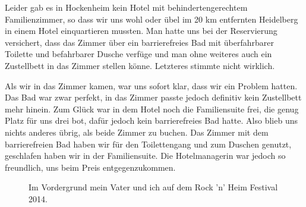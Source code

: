 \documentclass[fontsize=14pt,a4paper,headinclude,DIV=calc,automark]{scrbook}
\begin{document}
Leider gab es in Hockenheim kein Hotel mit behindertengerechtem Familienzimmer, so dass wir uns wohl oder übel im 20 km entfernten Heidelberg in einem Hotel einquartieren mussten. Man hatte uns bei der Reservierung versichert, dass das Zimmer über ein barrierefreies Bad mit überfahrbarer Toilette und befahrbarer Dusche verfüge und man ohne weiteres auch ein Zustellbett in das Zimmer stellen könne. Letzteres stimmte nicht wirklich.

Als wir in das Zimmer kamen, war uns sofort klar, dass wir ein Problem hatten. Das Bad war zwar perfekt, in das Zimmer passte jedoch definitiv kein Zustellbett mehr hinein. Zum Glück war in dem Hotel noch die Familiensuite frei, die genug Platz für uns drei bot, dafür jedoch kein barrierefreies Bad hatte. Also blieb uns nichts anderes übrig, als beide Zimmer zu buchen. Das Zimmer mit dem barrierefreien Bad haben wir für den Toilettengang und zum Duschen genutzt, geschlafen haben wir in der Familiensuite. Die Hotelmanagerin war jedoch so freundlich, uns beim Preis entgegenzukommen.

\setlength{\fboxsep}{0pt}    %
\setlength{\fboxrule}{0.2pt} %
\begin{figure}[ht]
    \centering
    \captionsetup{justification=raggedright}
    \caption{Im Vordergrund mein Vater und ich auf dem Rock 'n' Heim Festival 2014.}
    \label{fig:hockenheim}
\end{figure}
\end{document}
